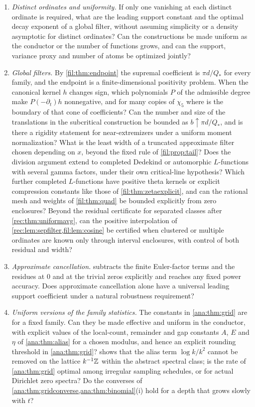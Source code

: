 \begin{enumerate}
including possible atoms at the endpoints of the support, and can \cref{fil:thm:slit} be sharpened to an exact
constrained minimax formula like that of \cref{fil:prop:cheb}?
\item \emph{Distinct ordinates and uniformity.} If only one vanishing at each distinct ordinate is required, what
are the leading support constant and the optimal decay exponent of a global filter, without assuming simplicity
or a density asymptotic for distinct ordinates? Can the constructions be made uniform as the conductor or the
number of functions grows, and can the support, variance proxy and number of atoms be optimized jointly?
\item \emph{Global filters.} By \cref{fil:thm:endpoint} the supremal coefficient is $\pi d/Q_*$ for every family,
and the endpoint is a finite-dimensional positivity problem. When the canonical kernel $h$ changes sign, which
polynomials $P$ of the admissible degree make $P(-\partial_t)h$ nonnegative, and for many copies of $\chi_5$ where is
the boundary of that cone of coefficients? Can the number and size of the translations in the subcritical
construction be bounded as $b\uparrow\pi d/Q_*$, and is there a rigidity statement for near-extremizers under a
uniform moment normalization? What is the least width of a truncated approximate filter chosen depending on $x$,
beyond the fixed rule of \cref{fil:prop:tail}? Does the division argument extend to completed Dedekind or
automorphic $L$-functions with several gamma factors, under their own critical-line hypothesis? Which further
completed $L$-functions have positive theta kernels or explicit compression constants like those of
\cref{fil:thm:zetaexplicit}, and can the rational mesh and weights of \cref{fil:thm:quad} be bounded explicitly from zero
enclosures? Beyond the residual certificate for separated classes after \cref{rec:thm:uniformavg}, can the positive
interpolation of \cref{rec:lem:sepfilter,fil:lem:cosine} be certified when clustered or multiple ordinates are known
only through interval enclosures, with control of both residual and width?
\item \emph{Approximate cancellation.}  subtracts the finite Euler-factor terms and the
residues at $0$ and at the trivial zeros explicitly and reaches any fixed power accuracy. Does approximate
cancellation alone have a universal leading support coefficient under a natural robustness requirement?
\item \emph{Uniform versions of the family statistics.} The constants in \cref{ana:thm:grid} are for a fixed
family. Can they be made effective and uniform in the conductor, with explicit values of the
local-count, remainder and gap constants $A$, $E$ and $\eta$ of \cref{ana:thm:alias} for a
chosen modulus, and hence an explicit rounding threshold in \cref{ana:thm:grid}?
 shows that the alias term $\log k/k^2$ cannot be
removed on the lattice $k^{-1}\mathbb{Z}$ within the abstract spectral class; is the rate of
\cref{ana:thm:grid} optimal among irregular sampling schedules, or for actual Dirichlet zero
spectra? Do the converses of \cref{ana:thm:gridconverse,ana:thm:binomial}(i) hold for a depth
that grows slowly with $t$?
\end{enumerate}
